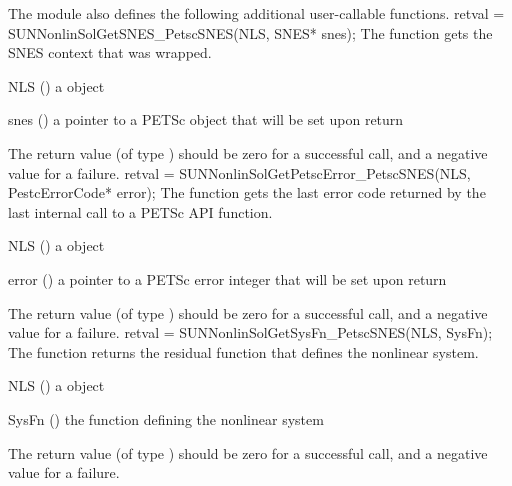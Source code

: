The {\sunnonlinsolpetsc} module also defines the following additional
user-callable functions.
{
  retval = SUNNonlinSolGetSNES\_PetscSNES(NLS, SNES* snes);
}
{
  The function  gets the
  SNES context that was wrapped.
}
{
  \begin{args}[SysFn]
  \item[NLS] ()
    a {\sunnonlinsol} object
  \item[snes] ()
    a pointer to a PETSc  object that will be set upon return
  \end{args}
}
{
  The return value  (of type ) should be zero for a
  successful call, and a negative value for a failure.
}
{}
{
  retval = SUNNonlinSolGetPetscError\_PetscSNES(NLS, PestcErrorCode* error);
}
{
  The function  gets the last error
  code returned by the last internal call to a PETSc API function.
}
{
  \begin{args}[SysFn]
  \item[NLS] ()
    a {\sunnonlinsol} object
  \item[error] ()
    a pointer to a PETSc error integer that will be set upon return
  \end{args}
}
{
  The return value  (of type ) should be zero for a
  successful call, and a negative value for a failure.
}
{}
{
  retval = SUNNonlinSolGetSysFn\_PetscSNES(NLS, SysFn);
}
{
  The function  returns the residual
  function that defines the nonlinear system.
}
{
  \begin{args}[SysFn]
  \item[NLS] ()
    a {\sunnonlinsol} object
  \item[SysFn] ()
    the function defining the nonlinear system
  \end{args}
}
{
  The return value  (of type ) should be zero for a
  successful call, and a negative value for a failure.
}
{}

